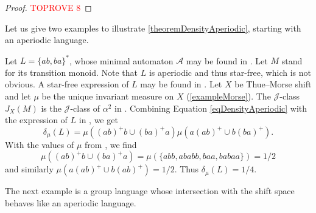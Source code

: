 \documentclass[a4paper,UKenglish,numberwithinsect,cleveref]{lipics-v2021}
\newcommand{\JJ}{\mathrel{\mathscr{J}}}
\newcommand{\A}{\mathcal A}
\begin{document}
\begin{proof}\textcolor{red}{TOPROVE 8}\end{proof}

Let us give two examples to illustrate   \cref{theoremDensityAperiodic}, starting with an aperiodic language.
\begin{example}\label{example(ab+ba)*}
    Let $L=\{ab,ba\}^*$, whose minimal automaton $\A$ may be found in \cite[Chapter~4, Example~2.1]{book/Pin1986}.  Let $M$ stand for its transition monoid. Note that $L$ is aperiodic and thus star-free, which is not obvious. A star-free expression of $L$ may be found in \cite[Chapter~4, Example~2.1]{book/Pin1986}. Let $X$ be Thue--Morse shift and let $\mu$ be the unique invariant measure on $X$ (\cref{exampleMorse}). The $\JJ$-class $J_X(M)$ is the $\JJ$-class of $\alpha^2$ in \cite[Chapter~4, Example~2.1]{book/Pin1986}.
    Combining Equation \eqref{eqDensityAperiodic} with the expression of $L$ in \cite[Chapter~4, Example~2.1]{book/Pin1986}, we get 
    \begin{equation*}
        \delta_\mu(L)=\mu((ab)^+b\cup (ba)^+a)\mu(a(ab)^+\cup b(ba)^+).
    \end{equation*}
    With the values of $\mu$ from \cite[Example 3.8.20]{DurandPerrin2021}, we find 
    \begin{equation*}
        \mu((ab)^+b\cup (ba)^+a)=\mu(\{abb,ababb,baa,babaa\})=1/2
    \end{equation*}
    and similarly $\mu(a(ab)^+\cup b(ab)^+)=1/2$. Thus $\delta_\mu(L)=1/4$.
\end{example}

The next example is a group language whose intersection with the shift space behaves like an aperiodic language. 
\end{document}

